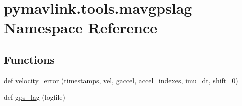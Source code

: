 \hypertarget{namespacepymavlink_1_1tools_1_1mavgpslag}{}\section{pymavlink.\+tools.\+mavgpslag Namespace Reference}
\label{namespacepymavlink_1_1tools_1_1mavgpslag}
\subsection*{Functions}
\begin{DoxyCompactItemize}
\item 
def \mbox{\hyperlink{namespacepymavlink_1_1tools_1_1mavgpslag_ab86565b5a9f5c4a8ffd725b81faeb819}{velocity\+\_\+error}} (timestamps, vel, gaccel, accel\+\_\+indexes, imu\+\_\+dt, shift=0)
\item 
def \mbox{\hyperlink{namespacepymavlink_1_1tools_1_1mavgpslag_af4a2cfb91f46374a5585be6ab70d5f4e}{gps\+\_\+lag}} (logfile)
\end{DoxyCompactItemize}
